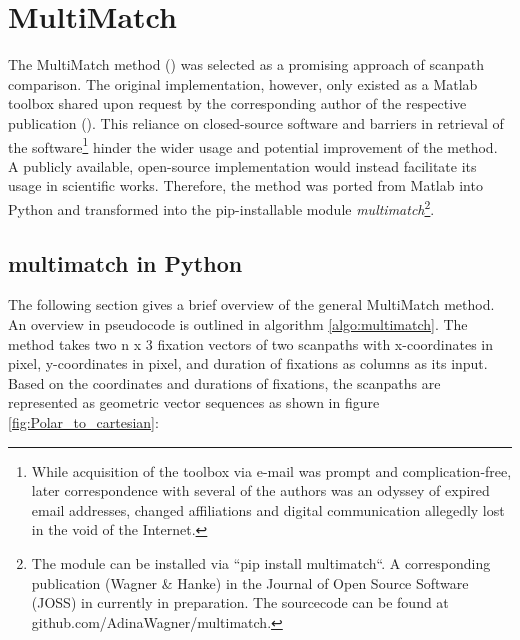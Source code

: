 \documentclass[a4paper, 12pt]{scrreprt}
\begin{document}
\section{MultiMatch}\label{section:multimatch}

The MultiMatch method (\cite{jarodzka2010vector}) was selected as a promising approach of scanpath comparison. The original implementation, however, only existed as a Matlab toolbox shared upon request by the corresponding author of the respective publication (\cite{dewhurst2012depends}). This reliance on closed-source software and barriers in retrieval of the software\footnote{While acquisition of the toolbox via e-mail was prompt and complication-free, later correspondence with several of the authors was an odyssey of expired email addresses, changed affiliations and digital communication allegedly lost in the void of the Internet.} hinder the wider usage and potential improvement of the method. A publicly available, open-source implementation would instead facilitate its usage in scientific works. Therefore, the method was ported from Matlab into Python and transformed into the pip-installable module \textit{multimatch}\footnote{The module can be installed via ``pip install multimatch``. A corresponding publication (Wagner \& Hanke) in the Journal of Open Source Software (JOSS) in currently in preparation. The sourcecode can be found at github.com/AdinaWagner/multimatch.}.

\subsection{multimatch in Python}
The following section gives a brief overview of the general MultiMatch method. An overview in pseudocode is outlined in algorithm \ref{algo:multimatch}. \newline 
The method takes two n x 3 fixation vectors of two scanpaths with x-coordinates in pixel, y-coordinates in pixel, and duration of fixations as columns as its input. Based on the coordinates and durations of fixations, the scanpaths are represented as geometric vector sequences as shown in figure \ref{fig:Polar_to_cartesian}:
\end{document}
